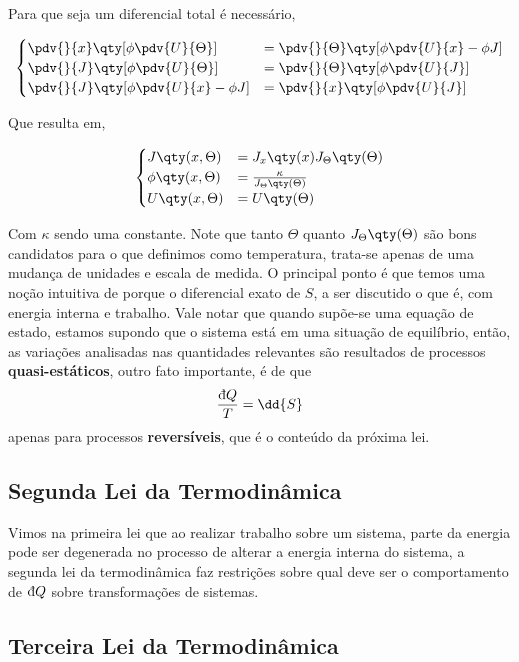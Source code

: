 \documentclass[twoside,reqno]{amsart}
\newcommand{\dbar}{\mbox{\dj}}
\numberwithin{equation}{section}
\begin{document}
\begin{refsection}
Para que seja um diferencial total é necessário,

\begin{align}
    \begin{cases}\pdv{}{x}\qty[\phi\pdv{U}{\Theta}]&=\pdv{}      
        {\Theta}\qty[\phi\pdv{U}{x}-\phi J]\\
        \pdv{}{J}\qty[\phi\pdv{U}{\Theta}]&=\pdv{}{\Theta}\qty[\phi\pdv{U}{J}]\\
        \pdv{}{J}\qty[\phi\pdv{U}{x}-\phi J]&=\pdv{}{x}\qty[\phi\pdv{U}{J}]
    \end{cases}
\end{align}

Que resulta em,

\begin{align}
    \begin{cases}
        J\qty(x,\Theta)&=J_x\qty(x)J_\Theta\qty(\Theta)\\
        \phi\qty(x,\Theta)&=\frac{\kappa}{J_\Theta\qty(\Theta)}\\
        U\qty(x,\Theta)&=U\qty(\Theta)
    \end{cases}
\end{align}

Com $\kappa$ sendo uma constante. Note que tanto $\Theta$ quanto $J_\Theta\qty(\Theta)$ são bons candidatos para o que definimos como temperatura, 
trata-se apenas de uma mudança de unidades e escala de medida. O principal ponto é que temos uma noção intuitiva de porque o diferencial exato de $S$, 
a ser discutido o que é, com energia interna e trabalho. Vale notar que quando supõe-se uma equação de estado, estamos supondo que o sistema está em 
uma situação de equilíbrio, então, as variações analisadas nas quantidades relevantes são resultados de processos \textbf{quasi-estáticos}, outro fato 
importante, é de que $$\frac{\dbar Q}{T}=\dd{S}$$ apenas para processos \textbf{reversíveis}, que é o conteúdo da próxima lei.

\subsection{Segunda Lei da Termodinâmica}

Vimos na primeira lei que ao realizar trabalho sobre um sistema, parte da energia pode ser degenerada no processo de 
alterar a energia interna do sistema, a segunda lei da termodinâmica faz restrições sobre qual deve ser o comportamento 
de $\dbar Q$ sobre transformações de sistemas.

\subsection{Terceira Lei da Termodinâmica}

\printbibliography[heading=subbibliography]
\end{refsection}
\end{document}
